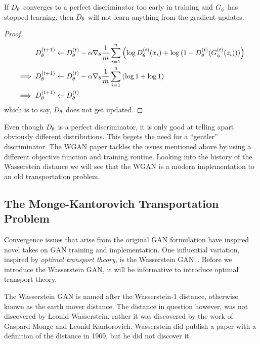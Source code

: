 \begin{theorem}%
  \label{thm:too-early}
  If $D_\theta$ converges to a perfect discriminator too early in training and $G_\phi$
  has stopped learning, then $D_\theta$ will not learn anything from the gradient
  updates.
\end{theorem}

\begin{proof}
  \begin{align}
    \label{eq:d-updates-no-good}
    D_\theta^{(t+1)} & \gets D_\theta^{(t)} - \alpha \nabla_\theta {1 \over m}
                 \sum_{i=1}^n \left( \log D^{(t)}_\theta(x_i)
                 + \log{(1 - D^{(t)}_\theta(G^{(t)}_\phi(z_i)))} \right) \\
    \implies D_\theta^{(t+1)} & \gets D_\theta^{(t)} - \alpha\nabla_\theta {1 \over m} \sum_{i=1}^n \left( \log{1} + \log{1} \right) \\
    \implies D_\theta^{(t+1)} & \gets D_\theta^{(t)}
  \end{align}
  which is to say, $D_\theta$ does not get updated.
\end{proof}

Even though $D_\theta$ is a perfect discriminator, it is only good at telling apart
obviously different distributions. This begets the need for a ``gentler''
discriminator. The WGAN paper tackles the issues mentioned above by using a
different objective function and training routine. Looking into the history of
the Wasserstein distance we will see that the WGAN is a modern implementation to
an old transportation problem.

\subsection{The Monge-Kantorovich Transportation Problem}

Convergence issues that arise from the original GAN formulation have inspired
novel takes on GAN training and implementation. One influential variation,
inspired by \textit{optimal transport theory}, is the Wasserstein
GAN~\cite{ref:arjovsky-2017}. Before we introduce the Wasserstein GAN, it will
be informative to introduce optimal transport theory.

The Wasserstein GAN is named after the Wasserstein-1 distance, otherwise known
as the earth mover distance. The distance in question however, was not
discovered by Leonid Wasserstein, rather it was discovered by the work of
Gaspard Monge and Leonid Kantorovich. Wasserstein did publish a paper with a
definition of the distance in 1969, but he did not discover it.


